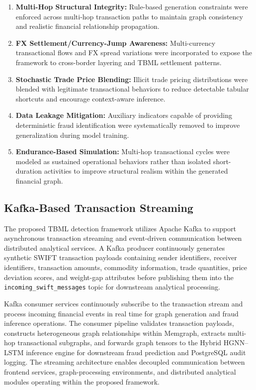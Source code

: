\begin{enumerate}
    \item \textbf{Multi-Hop Structural Integrity:} Rule-based generation constraints were enforced across multi-hop transaction paths to maintain graph consistency and realistic financial relationship propagation.

    \item \textbf{FX Settlement/Currency-Jump Awareness:} Multi-currency transactional flows and FX spread variations were incorporated to expose the framework to cross-border layering and TBML settlement patterns.

    \item \textbf{Stochastic Trade Price Blending:} Illicit trade pricing distributions were blended with legitimate transactional behaviors to reduce detectable tabular shortcuts and encourage context-aware inference.

    \item \textbf{Data Leakage Mitigation:} Auxiliary indicators capable of providing deterministic fraud identification were systematically removed to improve generalization during model training.

    \item \textbf{Endurance-Based Simulation:} Multi-hop transactional cycles were modeled as sustained operational behaviors rather than isolated short-duration activities to improve structural realism within the generated financial graph.

\end{enumerate}


\subsection[Kafka-Based Transaction Streaming]{\textbf{Kafka-Based Transaction Streaming}}

The proposed TBML detection framework utilizes Apache Kafka to support asynchronous transaction streaming and event-driven communication between distributed analytical services. A Kafka producer continuously generates synthetic SWIFT transaction payloads containing sender identifiers, receiver identifiers, transaction amounts, commodity information, trade quantities, price deviation scores, and weight-gap attributes before publishing them into the \texttt{incoming\_swift\_messages} topic for downstream analytical processing.

Kafka consumer services continuously subscribe to the transaction stream and process incoming financial events in real time for graph generation and fraud inference operations. The consumer pipeline validates transaction payloads, constructs heterogeneous graph relationships within Memgraph, extracts multi-hop transactional subgraphs, and forwards graph tensors to the Hybrid HGNN--LSTM inference engine for downstream fraud prediction and PostgreSQL audit logging. The streaming architecture enables decoupled communication between frontend services, graph-processing environments, and distributed analytical modules operating within the proposed framework.


